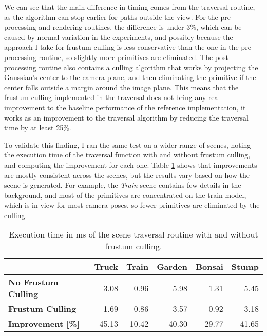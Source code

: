 We can see that the main difference in timing comes from the traversal routine, as the algorithm can stop earlier for paths outside the view. For the pre-processing and rendering routines, the difference is under 3\%, which can be caused by normal variation in the experiments, and possibly because the approach I take for frustum culling is less conservative than the one in the pre-processing routine, so slightly more primitives are eliminated. The post-processing routine also contains a culling algorithm that works by projecting the Gaussian's center to the camera plane, and then eliminating the primitive if the center falls outside a margin around the image plane. This means that the frustum culling implemented in the traversal does not bring any real improvement to the baseline performance of the reference implementation, it works as an improvement to the traversal algorithm by reducing the traversal time by at least 25\%.

To validate this finding, I ran the same test on a wider range of scenes, noting the execution time of the traversal function with and without frustum culling, and computing the improvement for each one. Table \ref{tab:fcall} shows that improvements are mostly consistent across the scenes, but the results vary based on how the scene is generated. For example, the \textit{Train} scene contains few details in the background, and most of the primitives are concentrated on the train model, which is in view for most camera poses, so fewer primitives are eliminated by the culling.

\begin{table}[H]
\centering
\begin{tabular}{lr|r|r|r|r}
\multicolumn{1}{c}{}          & \multicolumn{1}{c|}{\textbf{Truck}} & \multicolumn{1}{c|}{\textbf{Train}} & \multicolumn{1}{c|}{\textbf{Garden}} & \multicolumn{1}{c|}{\textbf{Bonsai}} & \multicolumn{1}{c}{\textbf{Stump}} \\ \hline
\textbf{No Frustum Culling}   & 3.08                                & 0.96                                & 5.98                                 & 1.31                                 & 5.45                               \\
\textbf{Frustum Culling}      & 1.69                                & 0.86                                & 3.57                                 & 0.92                                 & 3.18                               \\ \hline
\textbf{Improvement {[}\%{]}} & 45.13                               & 10.42                               & 40.30                                & 29.77                                & 41.65                                   
\end{tabular}
\caption{Execution time in ms of the scene traversal routine with and without frustum culling.}
\label{tab:fcall}
\end{table}

